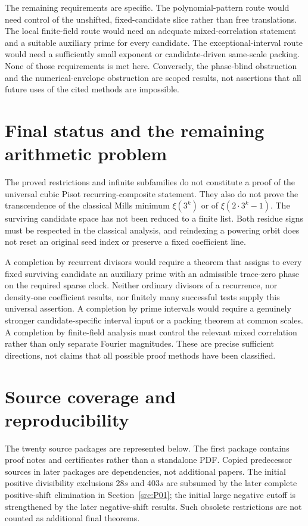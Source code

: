 \documentclass[11pt,a4paper]{article}
\theoremstyle{definition}\newtheorem{definition}[theorem]{Definition}
\theoremstyle{remark}\newtheorem{remark}[theorem]{Remark}
\begin{document}
The remaining requirements are specific. The polynomial-pattern route
would need control of the unshifted, fixed-candidate slice rather than
free translations. The local finite-field route would need an adequate
mixed-correlation statement and a suitable auxiliary prime for every
candidate. The exceptional-interval route would need a sufficiently
small exponent or candidate-driven same-scale packing. None of those
requirements is met here. Conversely, the phase-blind obstruction and
the numerical-envelope obstruction are scoped results, not assertions
that all future uses of the cited methods are impossible.



\endgroup
\clearpage
\section{Final status and the remaining arithmetic problem}\label{sec:final}
The proved restrictions and infinite subfamilies do not constitute a proof
of the universal cubic Pisot recurring-composite statement. They also do
not prove the transcendence of the classical Mills minimum $\xi(3^k)$ or
of $\xi(2\cdot3^k-1)$. The surviving candidate space has not been reduced
to a finite list. Both residue signs must be respected in the classical
analysis, and reindexing a powering orbit does not reset an original seed
index or preserve a fixed coefficient line.

A completion by recurrent divisors would require a theorem that assigns
to every fixed surviving candidate an auxiliary prime with an admissible
trace-zero phase on the required sparse clock. Neither ordinary divisors
of a recurrence, nor density-one coefficient results, nor finitely many
successful tests supply this universal assertion. A completion by prime
intervals would require a genuinely stronger candidate-specific interval
input or a packing theorem at common scales. A completion by finite-field
analysis must control the relevant mixed correlation rather than only
separate Fourier magnitudes. These are precise sufficient directions,
not claims that all possible proof methods have been classified.

\appendix
\section{Source coverage and reproducibility}\label{app:coverage}
The twenty source packages are represented below. The first package
contains proof notes and certificates rather than a standalone PDF.
Copied predecessor sources in later packages are dependencies, not
additional papers. The initial positive divisibility exclusions
$28s$ and $403s$ are subsumed by the later complete positive-shift
elimination in Section~\ref{src:P01}; the initial large negative cutoff
is strengthened by the later negative-shift results. Such obsolete
restrictions are not counted as additional final theorems.
\end{document}
